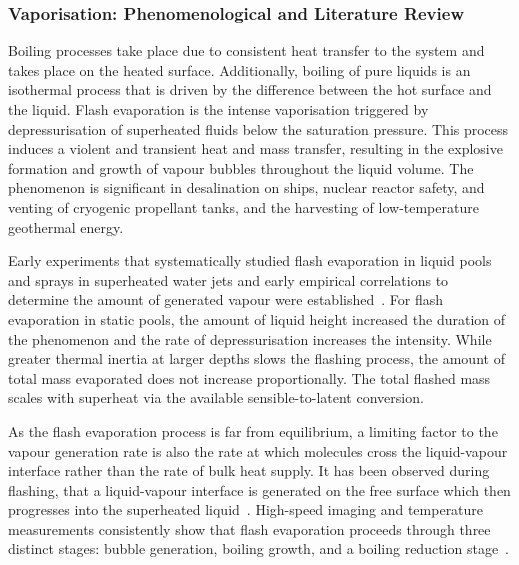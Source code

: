 \subsubsection{Vaporisation: Phenomenological and Literature Review}
Boiling processes take place due to consistent heat transfer to the system and takes place on the heated surface. 
Additionally, boiling of pure liquids is an isothermal process that is 
driven by the difference between the hot surface and the liquid. 
Flash evaporation is the intense vaporisation triggered by depressurisation 
of superheated fluids below the saturation pressure.
This process induces a violent and transient heat
and mass transfer, resulting in the explosive formation and growth
of vapour bubbles throughout the liquid volume. The phenomenon is significant 
in desalination on ships, nuclear reactor safety, and venting of cryogenic
propellant tanks, and the harvesting of low-temperature geothermal energy.~\cite{sauryExperimentalStudyFlash2002, wuExperimentalStudyFlash2019, liaoReviewNumericalModelling2021, mutairExperimentalInvestigationCharacteristics2010, vahajiEfficiencyTwophaseNozzle2014}

Early experiments that systematically studied flash evaporation in liquid pools and sprays in superheated 
water jets and early empirical correlations to determine the amount of generated 
vapour were established~\cite{miyatakeExperimentalStudySpray1981, miyatakeEffectLiquidTemperature1981, gopalakrishnaExperimentalStudyFlash1987, petersonInvestigationsLiquidflashingEvaporation1984}.
For flash evaporation in static pools, the amount of liquid height increased the duration 
of the phenomenon and the rate of depressurisation increases the intensity.
While greater thermal inertia at larger depths slows the flashing process, the amount of total 
mass evaporated does not increase proportionally. The total flashed mass scales with superheat via 
 the available sensible-to-latent conversion.~\cite{sauryFlashEvaporationWater2005,sauryExperimentalStudyFlash2002}

As the flash evaporation process is far from equilibrium, a limiting factor to the vapour generation rate is
 also the rate at which molecules cross the liquid-vapour interface rather than the rate 
 of bulk heat supply. It has been observed during flashing, that a liquid-vapour interface is generated 
on the free surface which then progresses into the superheated liquid~\cite{mansourReviewFlashEvaporation2019, HahneBarthau2000, reinkeExplosiveVaporizationSuperheated2001}.
High-speed imaging and temperature measurements consistently show that
flash evaporation proceeds through three distinct stages: bubble generation,
boiling growth, and a boiling reduction stage~\cite{wuExperimentalStudyFlash2019}.
 


